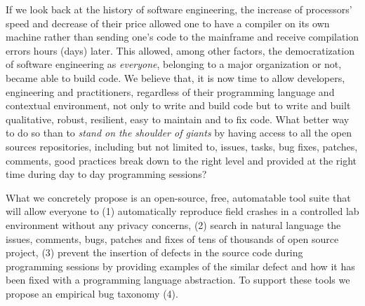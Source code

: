\documentclass[11pt,a4paper, cuthesis]{report}
\begin{document}
If we look back at the history of software engineering, the increase of processors' speed and decrease of their price allowed one to have a compiler on its own machine rather than sending one's code to the mainframe and receive compilation errors hours (days) later. This allowed, among other factors, the democratization of software engineering as {\it everyone}, belonging to a major organization or not, became able to build code. We believe that, it is now time to allow developers, engineering and practitioners, regardless of their programming language and contextual environment, not only to write and build code but to write and built qualitative, robust, resilient, easy to maintain and to fix code. What better way to do so than to {\it stand on the shoulder of giants} by having access to all the open sources repositories, including but not limited to, issues, tasks, bug fixes, patches, comments, good practices break down to the right level and provided at the right time during day to day programming sessions?

What we concretely propose is an open-source, free, automatable tool suite that will allow everyone to (1) automatically reproduce field crashes in a controlled lab environment without any privacy concerns, (2) search in natural language the issues, comments, bugs, patches and fixes of tens of thousands of open source project, (3) prevent the insertion of defects in the source code during programming sessions by providing examples of the similar defect and how it has been fixed with a programming language abstraction. To support these tools we propose an empirical bug taxonomy (4).




\end{document}
